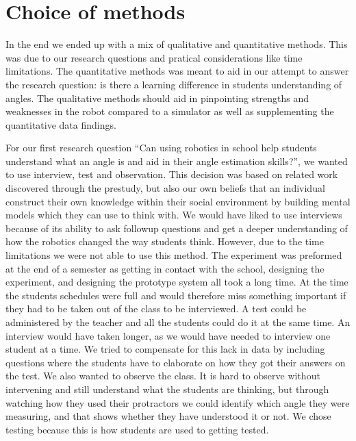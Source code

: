 \section{Choice of methods}
In the end we ended up with a mix of qualitative and quantitative methods. This was due to our research questions and pratical considerations like time limitations. 
The quantitative methods was meant to aid in our attempt to answer the research question: is there a learning difference in students understanding of angles. The qualitative methods should aid in pinpointing strengths and weaknesses in the robot compared to a simulator as well as supplementing the quantitative data findings. 

\bigskip\noindent
For our first research question ``Can using robotics in school help students understand what an angle is and aid in their angle estimation skills?'', we wanted to use interview, test and observation. This decision was based on related work discovered through the prestudy, but also our own beliefs that an individual construct their own knowledge within their social environment by building mental models which they can use to think with. We would have liked to use interviews because of its ability to ask followup questions and get a deeper understanding of how the robotics changed the way students think. 
However, due to the time limitations we were not able to use this method. 
The experiment was preformed at the end of a semester as getting in contact with the school, designing the experiment, and designing the prototype system all took a long time.
At the time the students schedules were full and would therefore miss something important if they had to be taken out of the class to be interviewed. A test could be administered by the teacher and all the students could do it at the same time. An interview would have taken longer, as we would have needed to interview one student at a time. We tried to compensate for this lack in data by including questions where the students have to elaborate on how they got their answers on the test. We also wanted to observe the class. It is hard to observe without intervening and still understand what the students are thinking, but through watching how they used their protractors we could identify which angle they were measuring, and that shows whether they have understood it or not. We chose testing because this is how students are used to getting tested.

